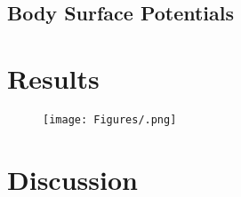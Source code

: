 \documentclass[12pt]{article}
\begin{document}
\subsection{Body Surface Potentials}
\par{}


\section{Results}


\begin{figure}[H]
	
	\centering
	\texttt{[image: Figures/.png]}
	\caption{ }
	\label{fig:FSCurve}
\end{figure}

\section{Discussion}





\end{document}
